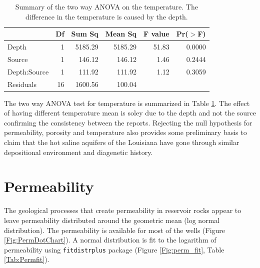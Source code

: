\documentclass[review,authoryear, 12pt]{elsarticle}\usepackage[]{graphicx}\usepackage[]{color}
\begin{document}
\begin{table}[ht]
\centering
\begin{tabular}{lrrrrr}
  \hline
 & Df & Sum Sq & Mean Sq & F value & Pr($>$F) \\ 
  \hline
Depth        & 1 & 5185.29 & 5185.29 & 51.83 & 0.0000 \\ 
  Source       & 1 & 146.12 & 146.12 & 1.46 & 0.2444 \\ 
  Depth:Source & 1 & 111.92 & 111.92 & 1.12 & 0.3059 \\ 
  Residuals    & 16 & 1600.56 & 100.04 &  &  \\ 
   \hline
\end{tabular}
\caption{Summary of the two way ANOVA on the temperature. The difference in the temperature is caused by the depth.} 
\label{Tab:temp_anova}
\end{table}


The two way ANOVA test for temperature is summarized in Table \ref{Tab:temp_anova}. The effect of having different temperature mean is soley due to the depth and not the source confirming the consistency between the reports. Rejecting the null hypothesis for permeability, porosity and temperature also provides some preliminary basis to claim that the hot saline aquifers of the Louisiana have gone through similar depositional environment and diagenetic history.


\section{Permeability}
The geological processes that create permeability in reservoir rocks appear to leave permeability distributed around the geometric mean (log normal distribution). The permeability is available for most of the wells (Figure \ref{Fig:PermDotChart}). A normal distribution is fit to the logarithm of permeability using \texttt{fitdistrplus} package (Figure \ref{Fig:perm_fit}, Table \ref{Tab:Permfit}).
\end{document}
